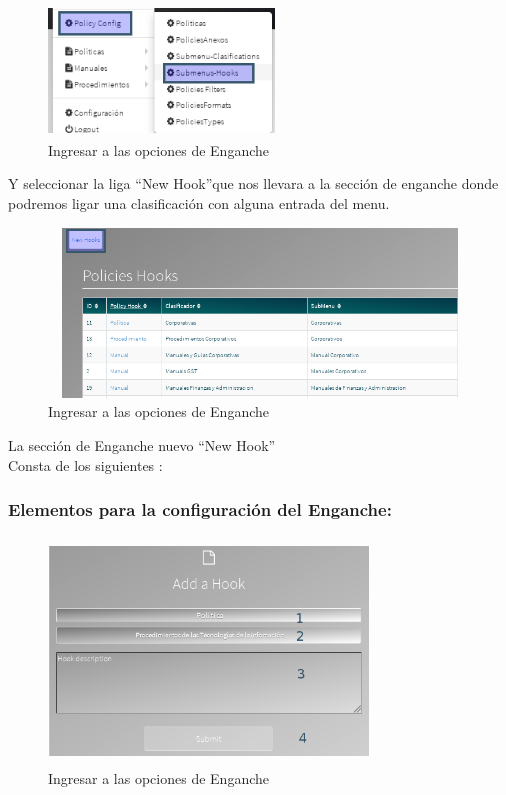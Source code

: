 \documentclass[12pt,letterpaper]{article}
\begin{document}
{\begin{subsection}{\color{blackgreen}}
              \begin{figure}[htb]
                \centering
                \includegraphics[angle=0,width=60mm,height=35mm]{img/Menu_044.png}
                \caption{Ingresar a las opciones de Enganche}
                \label{class}
              \end{figure}


      \newpage
      Y seleccionar la liga \textquotedblleft{New Hook}\textquotedblright  que nos llevara a
      la secci\'on de enganche donde podremos ligar una clasificaci\'on con alguna entrada del menu.
              \begin{figure}[htb]
                \centering
                \includegraphics[angle=0,width=120mm,height=45mm]{img/Selection_047.png}
                \caption{Ingresar a las opciones de Enganche}
                \label{class}
              \end{figure}

      La secci\'on de Enganche nuevo \textquotedblleft{New Hook}\textquotedblright \\
      Consta de los siguientes :

              \subsubsection{Elementos para la configuraci\'on del Enganche:}

                \begin{figure}[htb]
                  \centering
                  \includegraphics[angle=0,width=85mm,height=60mm]{img/Selection_048.png}
                  \caption{Ingresar a las opciones de Enganche}
                  \label{class}
                \end{figure}


\end{subsection}}
\end{document}
